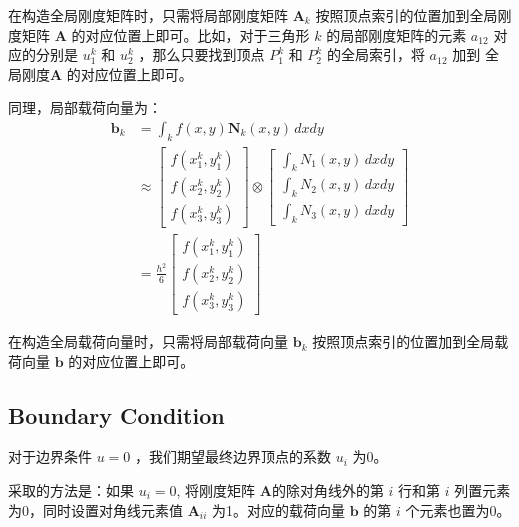 \documentclass[11pt]{ctexart}
\begin{document}
在构造全局刚度矩阵时，只需将局部刚度矩阵 $ \mathbf{A}_k $ 按照顶点索引的位置加到全局刚度矩阵 $ \mathbf{A} $ 的对应位置上即可。比如，对于三角形 $ k $ 的局部刚度矩阵的元素 $ a_{12} $ 对应的分别是 $ u_1^k $ 和 $ u_2^k $ ，那么只要找到顶点 $ P_1^k $ 和 $ P_2^k $ 的全局索引，将 $ a_{12} $ 加到 全局刚度$ \mathbf{A} $ 的对应位置上即可。

同理，局部载荷向量为：
\begin{equation}
  \begin{aligned}
    \mathbf{b}_k &= \int_{k} f(x,y) \mathbf{N}_k(x,y) \, dx dy \\
    &\approx \begin{bmatrix}
      f(x_1^k,y_1^k)\\
      f(x_2^k,y_2^k)\\
      f(x_3^k,y_3^k)
    \end{bmatrix}\otimes 
    \begin{bmatrix}
      \int_{k} N_1(x,y) \, dx dy\\
      \int_{k} N_2(x,y) \, dx dy\\
      \int_{k} N_3(x,y) \, dx dy
    \end{bmatrix}\\
    &= \frac{h^2}{6}\begin{bmatrix}
      f(x_1^k,y_1^k)\\
      f(x_2^k,y_2^k)\\
      f(x_3^k,y_3^k)
    \end{bmatrix}
  \end{aligned}
\end{equation}

在构造全局载荷向量时，只需将局部载荷向量 $ \mathbf{b}_k $ 按照顶点索引的位置加到全局载荷向量 $ \mathbf{b} $ 的对应位置上即可。

\subsection{Boundary Condition}

对于边界条件 $ u = 0 $ ，我们期望最终边界顶点的系数 $ u_i $ 为0。

采取的方法是：如果 $ u_i=0 $, 将刚度矩阵 $ \mathbf{A} $的除对角线外的第 $ i $ 行和第 $ i $ 列置元素为0，同时设置对角线元素值 $ \mathbf{A}_{ii} $ 为1。对应的载荷向量 $ \mathbf{b} $ 的第 $ i $ 个元素也置为0。
\end{document}
